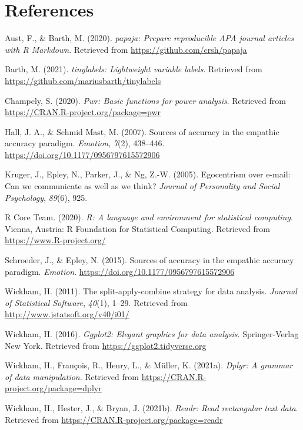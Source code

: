 \documentclass[
  english,
  man,floatsintext]{apa6}
\begin{document}
\newpage

\hypertarget{references}{%
\section{References}\label{references}}

\begingroup
\setlength{\parindent}{-0.5in}
\setlength{\leftskip}{0.5in}

\hypertarget{refs}{}
\leavevmode\hypertarget{ref-R-papaja}{}%
Aust, F., \& Barth, M. (2020). \emph{papaja: Prepare reproducible APA journal articles with R Markdown}. Retrieved from \url{https://github.com/crsh/papaja}

\leavevmode\hypertarget{ref-R-tinylabels}{}%
Barth, M. (2021). \emph{tinylabels: Lightweight variable labels}. Retrieved from \url{https://github.com/mariusbarth/tinylabels}

\leavevmode\hypertarget{ref-R-pwr}{}%
Champely, S. (2020). \emph{Pwr: Basic functions for power analysis}. Retrieved from \url{https://CRAN.R-project.org/package=pwr}

\leavevmode\hypertarget{ref-Hall_2007}{}%
Hall, J. A., \& Schmid Mast, M. (2007). Sources of accuracy in the empathic accuracy paradigm. \emph{Emotion}, \emph{7}(2), 438--446. \url{https://doi.org/10.1177/0956797615572906}

\leavevmode\hypertarget{ref-kruger2005egocentrism}{}%
Kruger, J., Epley, N., Parker, J., \& Ng, Z.-W. (2005). Egocentrism over e-mail: Can we communicate as well as we think? \emph{Journal of Personality and Social Psychology}, \emph{89}(6), 925.

\leavevmode\hypertarget{ref-R-base}{}%
R Core Team. (2020). \emph{R: A language and environment for statistical computing}. Vienna, Austria: R Foundation for Statistical Computing. Retrieved from \url{https://www.R-project.org/}

\leavevmode\hypertarget{ref-schr_SoundofInt}{}%
Schroeder, J., \& Epley, N. (2015). Sources of accuracy in the empathic accuracy paradigm. \emph{Emotion}. \url{https://doi.org/10.1177/0956797615572906}

\leavevmode\hypertarget{ref-R-plyr}{}%
Wickham, H. (2011). The split-apply-combine strategy for data analysis. \emph{Journal of Statistical Software}, \emph{40}(1), 1--29. Retrieved from \url{http://www.jstatsoft.org/v40/i01/}

\leavevmode\hypertarget{ref-R-ggplot2}{}%
Wickham, H. (2016). \emph{Ggplot2: Elegant graphics for data analysis}. Springer-Verlag New York. Retrieved from \url{https://ggplot2.tidyverse.org}

\leavevmode\hypertarget{ref-R-dplyr}{}%
Wickham, H., François, R., Henry, L., \& Müller, K. (2021a). \emph{Dplyr: A grammar of data manipulation}. Retrieved from \url{https://CRAN.R-project.org/package=dplyr}

\leavevmode\hypertarget{ref-R-readr}{}%
Wickham, H., Hester, J., \& Bryan, J. (2021b). \emph{Readr: Read rectangular text data}. Retrieved from \url{https://CRAN.R-project.org/package=readr}

\endgroup
\end{document}

